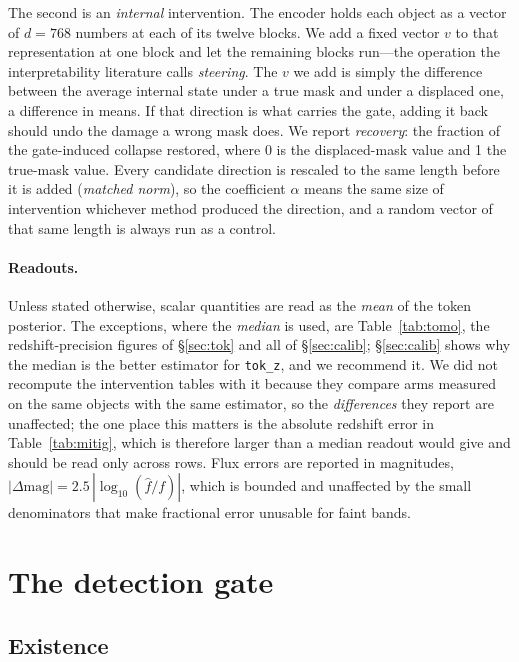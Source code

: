 \documentclass[11pt]{article}
\newcommand{\dmag}{|\Delta\mathrm{mag}|}
\begin{document}
The second is an \emph{internal} intervention. The encoder holds each object as a vector of
$d=768$ numbers at each of its twelve blocks. We add a fixed vector $v$ to that representation
at one block and let the remaining blocks run---the operation the interpretability literature
calls \emph{steering}. The $v$ we add is simply the difference between the average internal
state under a true mask and under a displaced one, a difference in means. If that direction is
what carries the gate, adding it back should undo the damage a wrong mask does. We report
\emph{recovery}: the fraction of the gate-induced collapse restored, where 0 is the displaced-mask
value and 1 the true-mask value. Every candidate direction is rescaled to the same length before
it is added (\emph{matched norm}), so the coefficient $\alpha$ means the same size of
intervention whichever method produced the direction, and a random vector of that same length is
always run as a control.

\paragraph{Readouts.} Unless stated otherwise, scalar quantities are read as the \emph{mean} of
the token posterior. The exceptions, where the \emph{median} is used, are
Table~\ref{tab:tomo}, the redshift-precision figures of \S\ref{sec:tok} and all of
\S\ref{sec:calib}; \S\ref{sec:calib} shows why the median is the better estimator for
\texttt{tok\_z}, and we recommend it. We did not recompute the intervention tables with it
because they compare arms measured on the same objects with the same estimator, so the
\emph{differences} they report are unaffected; the one place this matters is the absolute
redshift error in Table~\ref{tab:mitig}, which is therefore larger than a median readout would
give and should be read only across rows. Flux errors are reported in
magnitudes, $\dmag = 2.5\,|\log_{10}(\hat f / f)|$, which is bounded and unaffected by the small
denominators that make fractional error unusable for faint bands.

\section{The detection gate}
\label{sec:gate}

\subsection{Existence}
\end{document}
